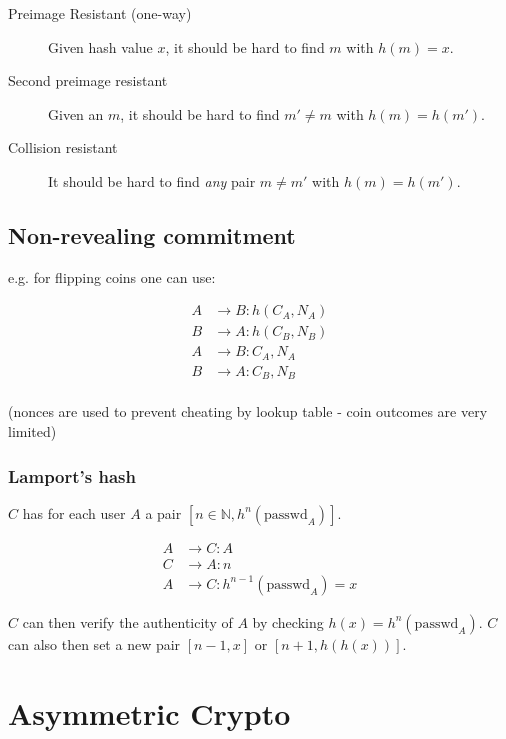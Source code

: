 \documentclass{article}
\begin{document}
\begin{description}

  \item[Preimage Resistant (one-way)] Given hash value $x$, it should be 
    hard to find $m$ with $h(m) = x$.

  \item[Second preimage resistant] Given an $m$, it should be hard to find 
    $m' \neq m$ with $h(m) = h(m')$.

  \item[Collision resistant] It should be hard to find \emph{any} pair $m \neq
    m'$ with $h(m) = h(m')$.

\end{description}


\subsection{Non-revealing commitment}

e.g. for flipping coins one can use:

\begin{align*}
  A & \longrightarrow B : h(C_A, N_A) \\
  B & \longrightarrow A : h(C_B,N_B)  \\
  A & \longrightarrow B : C_A, N_A    \\
  B & \longrightarrow A : C_B, N_B    \\
\end{align*}

(nonces are used to prevent cheating by lookup table - coin outcomes are very
limited)

\subsubsection{Lamport's hash}

$C$ has for each user $A$ a pair $[n \in \mathbb{N}, h^n(\text{passwd}_A)]$.

\begin{align*}
  A & \rightarrow C : A \\
  C & \rightarrow A : n \\
  A &\rightarrow C  : h^{n-1}(\text{passwd}_A) = x
\end{align*}

$C$ can then verify the authenticity of $A$ by checking $h(x)
= h^n(\text{passwd}_A)$. $C$ can also then set a new pair $[n-1,x]$ or
$[n+1, h(h(x))]$.

\section{Asymmetric Crypto}
\end{document}
